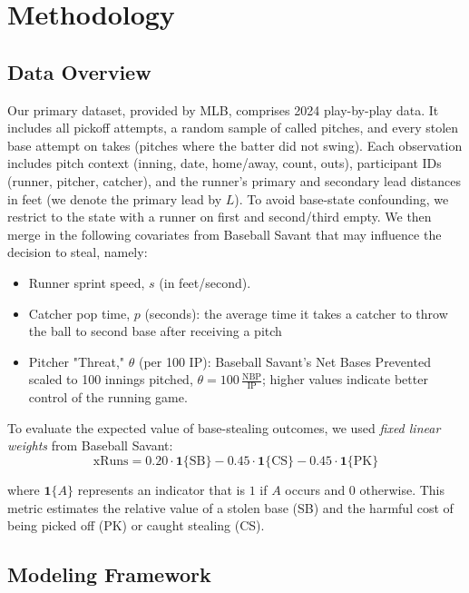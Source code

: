 \documentclass[12pt,letterpaper]{article}
\begin{document}
\section{Methodology}

\subsection{Data Overview}

Our primary dataset, provided by MLB, comprises 2024 play-by-play data. It includes all pickoff attempts, a random sample of called pitches, and every stolen base attempt on takes (pitches where the batter did not swing). Each observation includes pitch context (inning, date, home/away, count, outs), participant IDs (runner, pitcher, catcher), and the runner's primary and secondary lead distances in feet (we denote the primary lead by $L$). To avoid base-state confounding, we restrict to the state with a runner on first and second/third empty. We then merge in the following covariates from Baseball Savant that may influence the decision to steal, namely:
\begin{itemize}
    \item Runner sprint speed, $s$ (in feet/second).
    \item Catcher pop time, $p$ (seconds): the average time it takes a catcher to throw the ball to second base after receiving a pitch
    \item Pitcher "Threat," $\theta$ (per 100 IP): Baseball Savant's Net Bases Prevented \cite{BaseballSavantRunValueND} scaled to 100 innings pitched, $\theta = 100\,\frac{\mathrm{NBP}}{\mathrm{IP}}$; higher values indicate better control of the running game.
\end{itemize}
To evaluate the expected value of base-stealing outcomes, we used \emph{fixed linear weights} from Baseball Savant:
\begin{equation}
    \text{xRuns} = 0.20 \cdot \mathbf{1}\{\text{SB}\} - 0.45 \cdot \mathbf{1}\{\text{CS}\} - 0.45 \cdot \mathbf{1}\{\text{PK}\} \label{eq:xRuns}
\end{equation}

where $\mathbf{1}\{A\}$ represents an indicator that is $1$ if $A$ occurs and $0$ otherwise. This metric estimates the relative value of a stolen base (SB) and the harmful cost of being picked off (PK) or caught stealing (CS).

\subsection{Modeling Framework}
\end{document}

